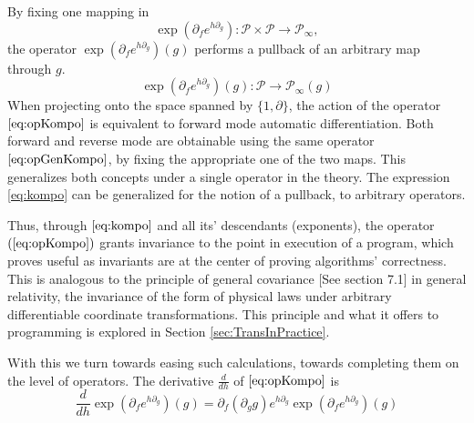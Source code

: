 \documentclass{article}
\newcommand{\dP}{\mathcal{P}}
\newcommand{\D}{\partial}
\begin{document}
 By fixing one mapping in  
 \begin{equation}\label{eq:opGenKompo}
\exp(\D_fe^{h\D_g}): \dP\times\dP\to\dP_\infty,
 \end{equation}
 the operator $\exp(\D_fe^{h\D_g})(g)$ performs a pullback of an arbitrary map through $g$. 
  \begin{equation}\label{eq:opKompo}
  \exp(\D_fe^{h\D_g})(g): \dP\to\dP_\infty(g)
  \end{equation}
 When projecting onto the space spanned by $\{1,\D\}$, the action of the operator $\eqref{eq:opKompo}$ is equivalent to forward mode automatic differentiation. Both forward and reverse mode are obtainable using the same operator $\eqref{eq:opGenKompo}$, by fixing the appropriate one of the two maps. This generalizes both concepts under a single operator in the theory. The expression \eqref{eq:kompo} can be generalized for the notion of a pullback, to arbitrary operators.
 
 Thus, through $\eqref{eq:kompo}$ and all its' descendants (exponents), the operator $(\ref{eq:opKompo})$ grants invariance to the point in execution of a program, which proves useful as invariants are at the center of proving algorithms' correctness. This is analogous to the principle of general covariance \cite{GeneralCovariance}[See section 7.1] in general relativity, the invariance of the form of physical laws under arbitrary differentiable coordinate transformations. This principle and what it offers to programming is explored in Section \ref{sec:TransInPractice}.
 
 With this we turn towards easing such calculations, towards completing them on the level of operators. The derivative $\frac{d}{dh}$ of $\eqref{eq:opKompo}$ is
 \begin{equation}\label{eq:dexp}
 \frac{d}{dh}\exp(\D_fe^{h\D_g})(g)=\D_f(\D_gg)e^{h\D_g}\exp(\D_fe^{h\D_g})(g)
 \end{equation}
 
\end{document}
